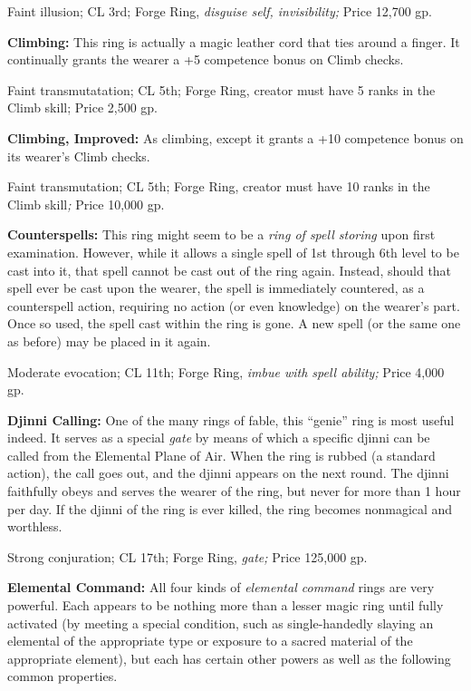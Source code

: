 \documentclass{article}
\begin{document}
Faint illusion; CL 3rd; Forge Ring, \textit{disguise self, invisibility; }Price 
12,700 gp.

\textbf{Climbing: }This ring is actually a magic leather cord that ties around 
a finger. It continually grants the wearer a +5 competence bonus on Climb checks.

Faint transmutatation; CL 5th; Forge Ring, creator must have 5 ranks in the Climb 
skill; Price 2,500 gp.

\textbf{Climbing, Improved: }As climbing, except it grants a +10 competence bonus 
on its wearer's Climb checks.

Faint transmutation; CL 5th; Forge Ring, creator must have 10 ranks in the Climb 
skill\textit{; }Price 10,000 gp.

\textbf{Counterspells:} This ring might seem to be a \textit{ring of spell storing 
}upon first examination. However, while it allows a single spell of 1st through 
6th level to be cast into it, that spell cannot be cast out of the ring again. 
Instead, should that spell ever be cast upon the wearer, the spell is immediately 
countered, as a counterspell action, requiring no action (or even knowledge) on 
the wearer's part. Once so used, the spell cast within the ring is gone. A new 
spell (or the same one as before) may be placed in it again.

Moderate evocation; CL 11th; Forge Ring, \textit{imbue with spell ability; }Price 
4,000 gp.

\textbf{Djinni Calling: }One of the many rings of fable, this ``genie'' ring is 
most useful indeed. It serves as a special \textit{gate }by means of which a specific 
djinni can be called from the Elemental Plane of Air. When the ring is rubbed (a 
standard action), the call goes out, and the djinni appears on the next round. 
The djinni faithfully obeys and serves the wearer of the ring, but never for more 
than 1 hour per day. If the djinni of the ring is ever killed, the ring becomes 
nonmagical and worthless.

Strong conjuration; CL 17th; Forge Ring, \textit{gate; }Price 125,000 gp.

\textbf{Elemental Command: }All four kinds of \textit{elemental command }rings 
are very powerful. Each appears to be nothing more than a lesser magic ring until 
fully activated (by meeting a special condition, such as single-handedly slaying 
an elemental of the appropriate type or exposure to a sacred material of the appropriate 
element), but each has certain other powers as well as the following common properties.
\end{document}

